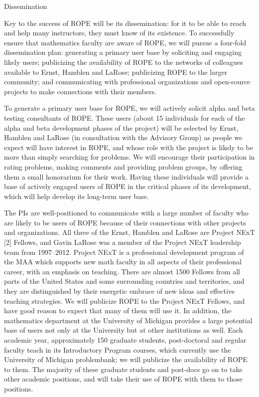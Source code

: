 \documentclass[11pt]{article}
\begin{document}
\begin{section}{Dissemination}

Key to the success of ROPE will be its dissemination: for it to be able
to reach and help many instructors, they must know of its existence.  To
successfully ensure that mathematics faculty are aware of ROPE, we will
pursue a four-fold dissemination plan: generating a primary user base by
soliciting and engaging likely users; publicizing the availability of ROPE to the networks of colleagues available to Ernst, Hamblen and
LaRose; publicizing ROPE to the larger community; and communicating
with professional organizations and open-source projects to make
connections with their members.

To generate a primary user base for ROPE, we will actively solicit
alpha and beta testing consultants of ROPE.  These users (about 15
individuals for each of the alpha and beta development phases of the
project) will be selected by Ernst, Hamblen and LaRose (in consultation
with the Advisory Group) as people we expect will have interest in ROPE, and whose role with the project is likely to be more than simply
searching for problems.  We will encourage their participation in rating
problems, making comments and providing problem groups, by offering them a
small honorarium for their work.  Having these individuals will provide a
base of actively engaged users of ROPE in the critical phases
of its development, which will help develop its long-term user base.

The PIs are well-positioned to communicate
with a large number of faculty who are likely to be users of ROPE
because of their connections with other projects and organizations.  All
three of the Ernst, Hamblen and LaRose are Project NExT [2]
Fellows, and Gavin LaRose was a member of the Project NExT leadership team
from 1997--2012.
Project NExT is a professional development program of the MAA which
supports new math faculty in all aspects of their professional career,
with an emphasis on teaching.  There are almost 1500 Fellows from all parts
of the United States and some surrounding countries and territories, and
they are distinguished by their energetic embrace of new ideas and
effective teaching strategies.  We will publicize ROPE to the Project
NExT Fellows, and have good reason to expect that many of them will use
it.  In addition, the mathematics department at 
the University of Michigan provides a large potential base of users not
only at the University but at other institutions as well.  Each academic
year, approximately 150 graduate students, post-doctoral and regular
faculty teach in its Introductory Program courses, which currently use the
University of Michigan problembank; we will publicize
the availability of ROPE to them.  The majority of these graduate
students and post-docs go on to take other academic positions, and will
take their use of ROPE with them to those positions.


\end{section}
\end{document}
